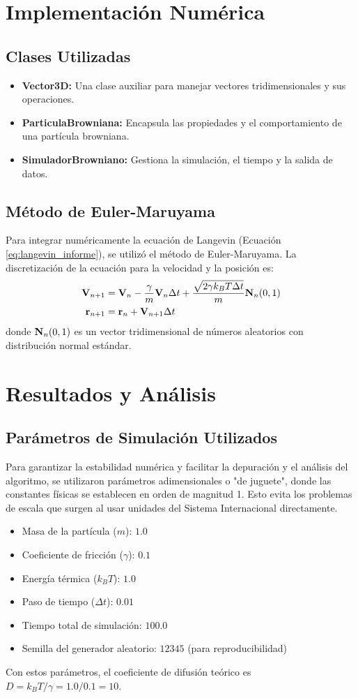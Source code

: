 \documentclass[11pt,a4paper]{article}
\begin{document}
\section{Implementación Numérica}
\subsection{Clases Utilizadas}
\begin{itemize}
    \item \textbf{Vector3D:} Una clase auxiliar para manejar vectores tridimensionales y sus operaciones.
    \item \textbf{ParticulaBrowniana:} Encapsula las propiedades y el comportamiento de una partícula browniana.
    \item \textbf{SimuladorBrowniano:} Gestiona la simulación, el tiempo y la salida de datos.
\end{itemize}

\subsection{Método de Euler-Maruyama}
Para integrar numéricamente la ecuación de Langevin (Ecuación \ref{eq:langevin_informe}), se utilizó el método de Euler-Maruyama. La discretización de la ecuación para la velocidad y la posición es:
\begin{align}
    \vb{V}_{n+1} &= \vb{V}_n - \frac{\gamma}{m}\vb{V}_n \Delta t + \frac{\sqrt{2\gamma k_B T \Delta t}}{m} \vb{N}_n(0,1) \\
    \vb{r}_{n+1} &= \vb{r}_n + \vb{V}_{n+1} \Delta t
\end{align}
donde $\vb{N}_n(0,1)$ es un vector tridimensional de números aleatorios con distribución normal estándar.

\section{Resultados y Análisis}
\subsection{Parámetros de Simulación Utilizados}
Para garantizar la estabilidad numérica y facilitar la depuración y el análisis del algoritmo, se utilizaron parámetros adimensionales o "de juguete", donde las constantes físicas se establecen en orden de magnitud 1. Esto evita los problemas de escala que surgen al usar unidades del Sistema Internacional directamente.
\begin{itemize}
    \item Masa de la partícula ($m$): $1.0$
    \item Coeficiente de fricción ($\gamma$): $0.1$
    \item Energía térmica ($k_B T$): $1.0$
    \item Paso de tiempo ($\Delta t$): $0.01$
    \item Tiempo total de simulación: $100.0$
    \item Semilla del generador aleatorio: $12345$ (para reproducibilidad)
\end{itemize}
Con estos parámetros, el coeficiente de difusión teórico es $D = k_B T / \gamma = 1.0 / 0.1 = 10$.
\end{document}
